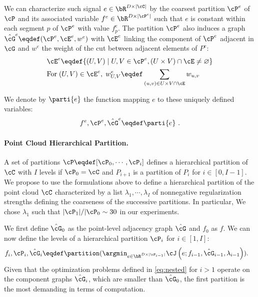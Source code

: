 We can characterize such signal $e \in \bR^{D \times \vert \cC \vert}$ by the coarsest partition $\cP^e$ of $\cP$ and its associated variable $f^e \in \bR^{D\times \vert \cP^e \vert}$ such that $e$ is constant within each segment $p$ of $\cP^e$ with value $f^e_p$. 
The partition $\cP^e$ also induces a graph $\hat{\cG}^e\eqdef(\cP^e,\cE^e,w^e)$ with $\cE^e$ linking the component of $\cP^e$ adjacent in $\cG$ and $w^e$ the weight of the cut between adjacent elements of $P^e$: 
\begin{align}
   &\cE^e \eqdef \{(U,V) \mid U,V \in \cP^e, (U \times V) \cap \cE \neq \varnothing \}\\
  &\text{For}\; (U,V) \in \cE^e,\; w^e_{U,V}\eqdef\sum_{(u,v) \in U \times V \cap \cE} w_{u,v} 
\end{align}

We denote by $\parti{e}$ the function mapping $e$ to these uniquely defined variables:  
\begin{align}
f^e, \cP^e, \hat{\cG}^e \eqdef \parti{e}~.
\end{align}


\paragraph{Point Cloud Hierarchical Partition.}
A set of partitions $\cP\eqdef[\cP_0, \cdots, \cP_i]$ defines a hierarchical partition of $\cC$ with $I$ levels if
$\cP_0=\cC$ and $P_{i+1}$ is a partition of $P_{i}$ for $i \in [0,I-1]$. 
We propose to use the formulations above to define a hierarchical partition of the point cloud $\cC$ characterized by a list $\lambda_1, \cdots, \lambda_{I}$ of nonnegative regularization strengths defining the coarseness of the successive partitions. In particular, We chose $\lambda_1$ such that $\vert \cP_1 \vert / \vert \cP_0 \sim 30$ in our experiments.
 
We first define $\hat{\cG}_0$ as the point-level adjacency graph $\hat{\cG}$ and $f_0$ as $f$. We can now define the levels of a hierarchical partition $\cP_i$ for $i \in [1,I]$:
\begin{align}\label{eq:nested}
    f_{i}, \cP_{i}, \hat{\cG}_{i}
    &\eqdef \partition (
        \argmin_{e \in \bR^{D \times \vert \cP_{i-1} \vert}}
        \cJ
        \left(
            e; f_{i-1}, \hat{\cG}_{i-1}, \lambda_{i-1}
        \right)
    ).
\end{align}
Given that the optimization problems defined in \eqref{eq:nested} for $i>1$ operate on the component graphs $\hat{\cG}_i$, which are smaller than $\hat{\cG}_0$, the first partition is the most demanding in terms of computation.

